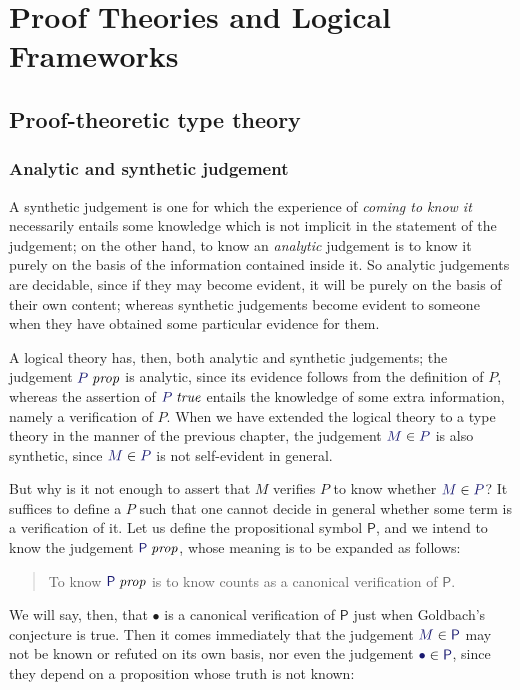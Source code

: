 \onehalfspacing

\chapter{Proof Theories and Logical Frameworks}

\section{Proof-theoretic type theory}

\subsection{Analytic and synthetic judgement}

A synthetic judgement is one for which the experience of \emph{coming
to know it} necessarily entails some knowledge which is not implicit
in the statement of the judgement; on the other hand, to know an
\emph{analytic} judgement is to know it purely on the basis of the
information contained inside it. So analytic judgements are decidable,
since if they may become evident, it will be purely on the basis of
their own content; whereas synthetic judgements become evident to
someone when they have obtained some particular evidence for them.

A logical theory has, then, both analytic and synthetic judgements;
the judgement $\isprop{P}$ is analytic, since its evidence follows
from the definition of $P$, whereas the assertion of $\istrue{P}$
entails the knowledge of some extra information, namely a verification
of $P$. When we have extended the logical theory to a type theory in
the manner of the previous chapter, the judgement $\ver{M}{P}$ is
also synthetic, since $\ver{M}{P}$ is not self-evident in general.

But why is it not enough to assert that $M$ verifies $P$ to know
whether $\ver{M}{P}$? It suffices to define a $P$ such that one cannot
decide in general whether some term is a verification of it. Let us
define the propositional symbol $\mathsf{P}$, and we intend to know
the judgement $\isprop{\mathsf{P}}$, whose meaning is to be expanded as
follows:
\begin{quote}
  To know $\isprop{\mathsf{P}}$ is to know counts as a canonical verification of $\mathsf{P}$.
\end{quote}

We will say, then, that $\bullet$ is a canonical verification of
$\mathsf{P}$ just when Goldbach's conjecture is true. Then it comes
immediately that the judgement $\ver{M}{\mathsf{P}}$ may not be known
or refuted on its own basis, nor even the judgement
$\ver{\bullet}{\mathsf{P}}$, since they depend on a proposition whose
truth is not known:


